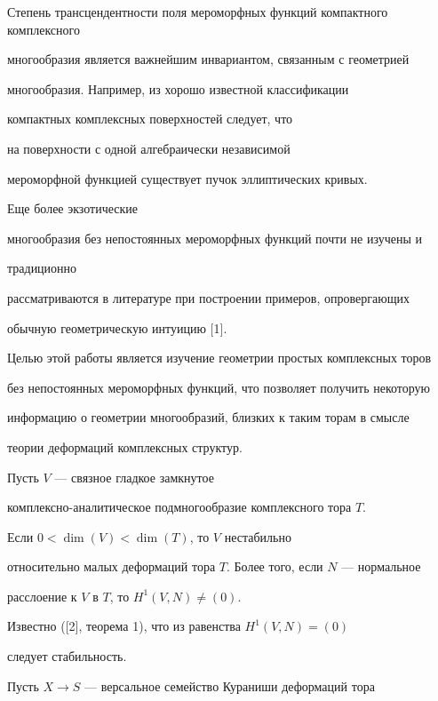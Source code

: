 Степень трансцендентности поля мероморфных функций компактного комплексного


многообразия является важнейшим инвариантом, связанным с геометрией


многообразия. Например, из хорошо известной классификации


компактных комплексных поверхностей следует, что


на поверхности с одной алгебраически независимой


мероморфной функцией существует пучок эллиптических кривых.


Еще более экзотические


многообразия без непостоянных мероморфных функций почти не изучены и


традиционно


рассматриваются в литературе при построении примеров, опровергающих


обычную геометрическую интуицию [1].





Целью этой работы является изучение геометрии простых комплексных торов


без непостоянных мероморфных функций, что позволяет получить некоторую


информацию о геометрии многообразий, близких к таким торам в смысле


теории деформаций комплексных структур.





\begin{thm}


Пусть $V$ --- связное гладкое замкнутое


комплексно-аналитическое подмногообразие комплексного тора $T$.


Если $0<\dim (V)<\dim (T)$, то $V$ нестабильно


относительно малых деформаций тора $T$. Более того, если $N$ --- нормальное


расслоение к $V$ в $T$, то $H^1(V,N)\neq(0)$.


\end{thm}





Известно ([2], теорема 1), что из равенства $H^1(V,N)=(0)$


следует стабильность.


Пусть $X\to S$ --- версальное семейство Кураниши деформаций тора


